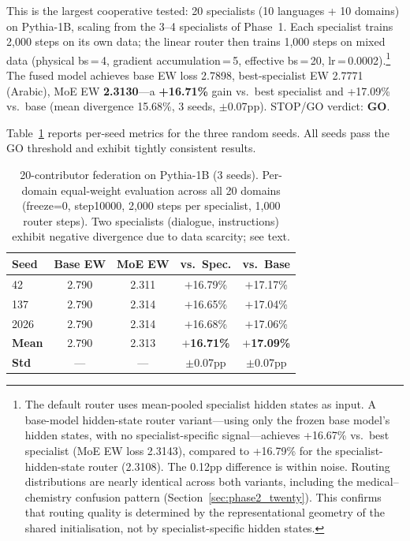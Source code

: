 \documentclass{article}
\begin{document}
This is the largest cooperative tested: 20 specialists (10 languages + 10 domains) on Pythia-1B, scaling from the 3--4 specialists of Phase~1. Each specialist trains 2,000 steps on its own data; the linear router then trains 1,000 steps on mixed data (physical bs\,=\,4, gradient accumulation\,=\,5, effective bs\,=\,20, lr\,=\,0.0002).\footnote{The default router uses mean-pooled specialist hidden states as input. A base-model hidden-state router variant---using only the frozen base model's hidden states, with no specialist-specific signal---achieves +16.67\% vs.\ best specialist (MoE EW loss 2.3143), compared to +16.79\% for the specialist-hidden-state router (2.3108). The 0.12pp difference is within noise. Routing distributions are nearly identical across both variants, including the medical--chemistry confusion pattern (Section~\ref{sec:phase2_twenty}). This confirms that routing quality is determined by the representational geometry of the shared initialisation, not by specialist-specific hidden states.} The fused model achieves base EW loss 2.7898, best-specialist EW 2.7771 (Arabic), MoE EW \textbf{2.3130}---a \textbf{+16.71\%} gain vs.\ best specialist and +17.09\% vs.\ base (mean divergence 15.68\%, 3 seeds, $\pm$0.07pp). STOP/GO verdict: \textbf{GO}.

Table~\ref{tab:twenty} reports per-seed metrics for the three random seeds. All seeds pass the GO threshold and exhibit tightly consistent results.

\begin{table}[h]
\centering
\caption{20-contributor federation on Pythia-1B (3 seeds). Per-domain equal-weight
evaluation across all 20 domains (freeze=0, step10000, 2{,}000 steps per specialist,
1{,}000 router steps). Two specialists (dialogue, instructions) exhibit negative
divergence due to data scarcity; see text.}
\label{tab:twenty}
\small
\begin{tabular}{lcccc}
\toprule
\textbf{Seed} & \textbf{Base EW} & \textbf{MoE EW} & \textbf{vs.\ Spec.} & \textbf{vs.\ Base} \\
\midrule
42   & 2.790 & 2.311 & $+$16.79\% & $+$17.17\% \\
137  & 2.790 & 2.314 & $+$16.65\% & $+$17.04\% \\
2026 & 2.790 & 2.314 & $+$16.68\% & $+$17.06\% \\
\midrule
\textbf{Mean} & 2.790 & 2.313 & \textbf{$+$16.71\%} & \textbf{$+$17.09\%} \\
\textbf{Std}  & ---   & ---   & $\pm$0.07pp        & $\pm$0.07pp        \\
\bottomrule
\end{tabular}
\end{table}
\end{document}
